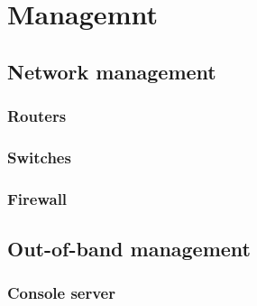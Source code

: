 \chapter{Managemnt}

\section{Network management}

\subsection{Routers}

\subsection{Switches}

\subsection{Firewall}

\section{Out-of-band management}

\subsection{Console server}